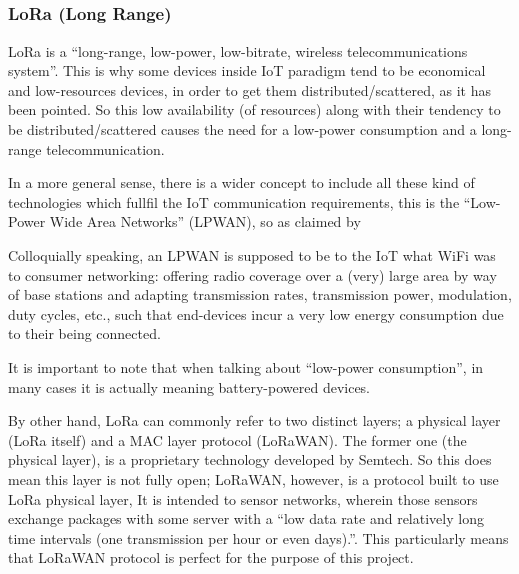 \documentclass[11pt,a4paper,dvipsnames,twoside]{article}
\begin{document}
\subsubsection{\texorpdfstring{LoRa\textsuperscript{\textregistered} (Lo{\normalfont\sffamily ng} Ra{\normalfont\sffamily nge})}{LoRa (Long Range)}}
LoRa is a \enquote{long-range, low-power, low-bitrate, wireless telecommunications system}\cite[]{LoRaGeneral}. This is why some devices inside IoT paradigm tend to be economical and low-resources devices, in order to get them distributed/scattered, as it has been pointed. So this low availability (of resources) along with their tendency to be distributed/scattered causes the need for a low-power consumption and a long-range telecommunication.

In a more general sense, there is a wider concept to include all these kind of technologies which fullfil the IoT communication requirements, this is the \enquote{Low-Power Wide Area Networks} (LPWAN), so as claimed by \cite[]{LoRaGeneral}

\begin{quoting}
  Colloquially  speaking,  an LPWAN is supposed to be to the IoT what WiFi was to consumer networking: offering radio coverage over a (very) large area by way of base stations and adapting transmission rates, transmission power, modulation, duty cycles, etc., such that end-devices incur a very low energy consumption due to their being connected.
\end{quoting}

It is important to note that when talking about \enquote{low-power consumption}, in many cases it is actually meaning battery-powered devices.

By other hand, LoRa can commonly refer to two distinct layers; a physical layer (LoRa itself) and a MAC layer protocol (LoRaWAN). The former one (the physical layer), is a proprietary technology developed by Semtech. So this does mean this layer is not fully open; LoRaWAN, however, is a protocol built to use LoRa physical layer,  It is intended to sensor networks, wherein those sensors exchange packages with some server with a \enquote{low data rate and relatively long time intervals (one transmission per hour or even days).}\cite[p.~9]{LoRaGeneral}. This particularly means that LoRaWAN protocol is perfect for the purpose of this project.  
\end{document}
